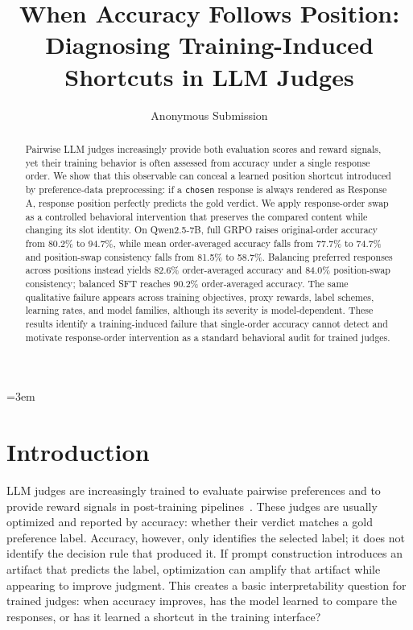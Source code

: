 \documentclass[letterpaper]{article}
\title{When Accuracy Follows Position: Diagnosing Training-Induced Shortcuts in LLM Judges}
\author{Anonymous Submission}
\begin{document}
\emergencystretch=3em
\maketitle

\begin{abstract}
Pairwise LLM judges increasingly provide both evaluation scores and reward signals, yet their training behavior is often assessed from accuracy under a single response order. We show that this observable can conceal a learned position shortcut introduced by preference-data preprocessing: if a \texttt{chosen} response is always rendered as Response A, response position perfectly predicts the gold verdict. We apply response-order swap as a controlled behavioral intervention that preserves the compared content while changing its slot identity. On Qwen2.5-7B, full GRPO raises original-order accuracy from 80.2\% to 94.7\%, while mean order-averaged accuracy falls from 77.7\% to 74.7\% and position-swap consistency falls from 81.5\% to 58.7\%. Balancing preferred responses across positions instead yields 82.6\% order-averaged accuracy and 84.0\% position-swap consistency; balanced SFT reaches 90.2\% order-averaged accuracy. The same qualitative failure appears across training objectives, proxy rewards, label schemes, learning rates, and model families, although its severity is model-dependent. These results identify a training-induced failure that single-order accuracy cannot detect and motivate response-order intervention as a standard behavioral audit for trained judges.
\end{abstract}

\section{Introduction}

LLM judges are increasingly trained to evaluate pairwise preferences and to provide reward signals in post-training pipelines~\citep{zheng2023judging,zheng2024arena}. These judges are usually optimized and reported by accuracy: whether their verdict matches a gold preference label. Accuracy, however, only identifies the selected label; it does not identify the decision rule that produced it. If prompt construction introduces an artifact that predicts the label, optimization can amplify that artifact while appearing to improve judgment. This creates a basic interpretability question for trained judges: when accuracy improves, has the model learned to compare the responses, or has it learned a shortcut in the training interface?
\end{document}
